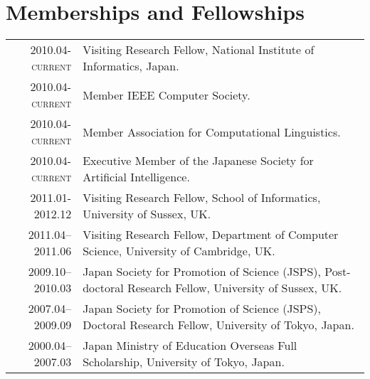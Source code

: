\documentclass[a4paper,11pt]{article}
\begin{document}
\section{Memberships and Fellowships}
\begin{tabular}{r p{11cm}}
\textsc{2010.04-current} & Visiting Research Fellow, National Institute of Informatics, Japan.\\
\textsc{2010.04-current} & Member IEEE Computer Society. \\
\textsc{2010.04-current} & Member Association for Computational Linguistics.\\
\textsc{2010.04-current} & Executive Member of the Japanese Society for Artificial Intelligence.\\
\textsc{2011.01-2012.12} & Visiting Research Fellow, School of Informatics, University of Sussex, UK.\\
\textsc{2011.04--2011.06} & Visiting Research Fellow, Department of Computer Science, University of Cambridge, UK. \\
\textsc{2009.10--2010.03} & Japan Society for Promotion of Science (JSPS), Post-doctoral Research Fellow, University of Sussex, UK. \\
\textsc{2007.04--2009.09} & Japan Society for Promotion of Science (JSPS), Doctoral Research Fellow, University of Tokyo, Japan.\\
\textsc{2000.04--2007.03} & Japan Ministry of Education Overseas Full Scholarship, University of Tokyo, Japan.
\end{tabular}


\end{document}
